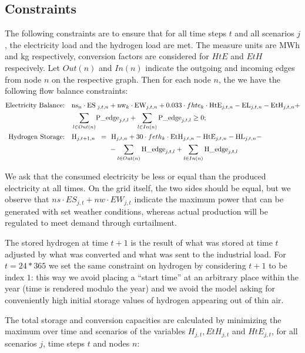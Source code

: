 \documentclass[english]{article}
\numberwithin{definition}{section}
\numberwithin{theorem}{section}
\numberwithin{problem}{section}
\begin{document}
\subsection{Constraints}
The following constraints are to ensure that for all time steps $t$ and all scenarios $j$, the electricity load and the hydrogen load are met. The measure units are MWh and kg respectively, conversion factors are considered for $HtE$ and $EtH$ respecively.
Let $Out(n)$ and $In(n)$ indicate the outgoing and incoming edges from node $n$ on the respective graph. Then for each node $n$, the we have the following flow balance constraints:
\begin{align*}
    \text{Electricity Balance:} \quad & \text{ns}_n \cdot \text{ES}\hspace{-1em}&_{j,t,n}&+ \text{nw}_k \cdot \text{EW}_{j,t,n} + 0.033 \cdot fhte_k \cdot \text{HtE}_{j,t,n} - \text{EL}_{j,t,n} - \text{EtH}_{j,t,n} + \\
    & \sum_{l\in Out(n)}\hspace{-1em}& \text{P\_e}&\text{dge}_{j,t,l} + \sum_{l\in In(n)} \text{P\_edge}_{j,t,l} \ge 0;\\
    \text{Hydrogen Storage:} \quad & \text{H}_{j,t+1,n} \hspace{-1em}&=\ & \text{ H}_{j,t,n} + 30 \cdot feth_k \cdot \text{EtH}_{j,t,n} - \text{HtE}_{j,t,n} - \text{HL}_{j,t,n} -\\ &&& - \sum_{l\in Out(n)}\text{H\_edge}_{j,t,l} + \sum_{l\in In(n)}\text{H\_edge}_{j,t,l}
\end{align*}

We ask that the consumed electricity be less or equal than the produced electricity at all times. On the grid itself, the two sides should be equal, but we observe that $ns\cdot ES_{j,t} + nw\cdot EW_{j,t}$ indicate the maximum power that can be generated with set weather conditions, whereas actual production will be regulated to meet demand through curtailment.

The stored hydrogen at time $t+1$ is the result of what was stored at time $t$ adjusted by what was converted and what was sent to the industrial load. For $t=24*365$ we set the same constraint on hydrogen by considering $t+1$ to be index $1$: this way we avoid placing a ``start time'' at an arbitrary place within the year (time is rendered modulo the year) and we avoid the model asking for conveniently high initial storage values of hydrogen appearing out of thin air.

The total storage and conversion capacities are calculated by minimizing the maximum over time and scenarios of the variables $H_{j,t}, EtH_{j,t}$ and $HtE_{j,t}$, for all scenarios \(j\), time steps \(t\) and nodes \(n\):
\end{document}
